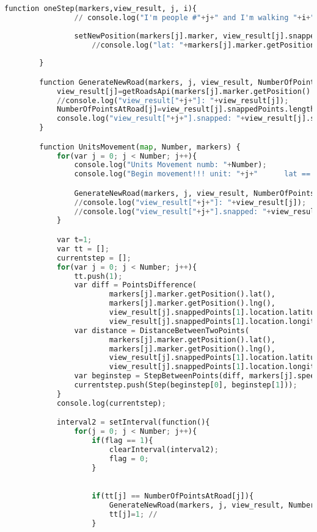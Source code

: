 \documentclass[a4paper]{article}
\begin{document}
\begin{lstlisting}[language=python,tabsize = 1,breaklines=true, breakatwhitespace=false,frame=single]
		function oneStep(markers,view_result, j, i){
				// console.log("I'm people #"+j+" and I'm walking "+i+" step!!");
				
				setNewPosition(markers[j].marker, view_result[j].snappedPoints[i-1].location.latitude, view_result[j].snappedPoints[i-1].location.longitude);
					//console.log("lat: "+markers[j].marker.getPosition().lat()+"lng: "+markers[j].marker.getPosition().lng());
				
		}

		function GenerateNewRoad(markers, j, view_result, NumberOfPointsAtRoad){
			view_result[j]=getRoadsApi(markers[j].marker.getPosition().lat(),markers[j].marker.getPosition().lng(), 2);
			//console.log("view_result["+j+"]: "+view_result[j]);
			NumberOfPointsAtRoad[j]=view_result[j].snappedPoints.length;
			console.log("view_result["+j+"].snapped: "+view_result[j].snappedPoints.length);
		}

		function UnitsMovement(map, Number, markers) {	
			for(var j = 0; j < Number; j++){
				console.log("Units Movement numb: "+Number);			
				console.log("Begin movement!!! unit: "+j+"      lat == "+markers[j].marker.getPosition().lat()+" lng == "+markers[j].marker.getPosition().lng());

				GenerateNewRoad(markers, j, view_result, NumberOfPointsAtRoad);
				//console.log("view_result["+j+"]: "+view_result[j]);
				//console.log("view_result["+j+"].snapped: "+view_result[j].snappedPoints.length);
			}

			var t=1;
			var tt = []; 
			currentstep = []; 
			for(var j = 0; j < Number; j++){
				tt.push(1);
				var diff = PointsDifference(
						markers[j].marker.getPosition().lat(),
						markers[j].marker.getPosition().lng(),
						view_result[j].snappedPoints[1].location.latitude,
						view_result[j].snappedPoints[1].location.longitude);
				var distance = DistanceBetweenTwoPoints(
						markers[j].marker.getPosition().lat(),
						markers[j].marker.getPosition().lng(),
						view_result[j].snappedPoints[1].location.latitude,
						view_result[j].snappedPoints[1].location.longitude);
				var beginstep = StepBetweenPoints(diff, markers[j].speed, distance);
				currentstep.push(Step(beginstep[0], beginstep[1]));
			}
			console.log(currentstep);

			interval2 = setInterval(function(){
				for(j = 0; j < Number; j++){
					if(flag == 1){ 
						clearInterval(interval2);
						flag = 0;
					}

					
					if(tt[j] == NumberOfPointsAtRoad[j]){ 
						GenerateNewRoad(markers, j, view_result, NumberOfPointsAtRoad);
						tt[j]=1; //
					}
					

\end{lstlisting}
\end{document}
